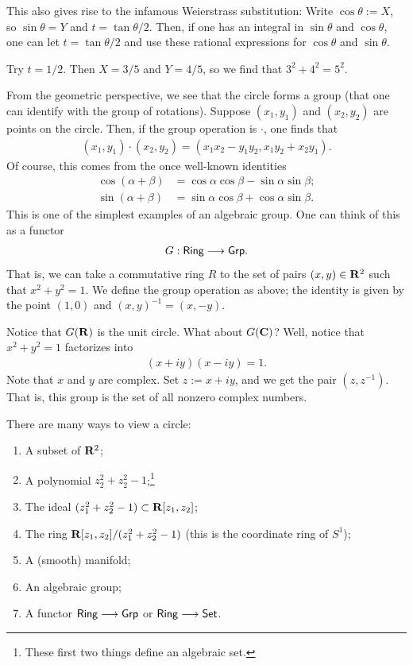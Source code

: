 \documentclass [11 pt, oneside] {article}
\begin{document}
This also gives rise to the infamous Weierstrass substitution: Write $\cos \theta := X$, so $\sin \theta = Y$ and $t= \tan \theta/2$. Then, if one has an integral in $\sin \theta$ and $\cos \theta$, one can let $t = \tan\theta/2$ and use these rational expressions for $\cos\theta$ and $\sin \theta$.

Try $t=1/2$. Then $X=3/5$ and $Y=4/5$, so we find that $3^2 + 4^2 = 5^2$.

From the geometric perspective, we see that the circle forms a group (that one can identify with the group of rotations). Suppose $(x_1,y_1)$ and $(x_2,y_2)$ are points on the circle. Then, if the group operation is $\cdot$, one finds that
\begin{align*}
	(x_1,y_1) \cdot (x_2,y_2) = (x_1x_2-y_1y_2, x_1y_2+x_2y_1).
\end{align*}
Of course, this comes from the once well-known identities
\begin{align*}
	\cos(\alpha+\beta) &=\cos\alpha \cos\beta- \sin \alpha \sin \beta;\\
	\sin(\alpha + \beta) &= \sin\alpha \cos\beta + \cos \alpha \sin \beta.
\end{align*}
This is one of the simplest examples of an algebraic group. One can think of this as a functor
\begin{align*}
	G : \textsf{Ring} \longrightarrow \textsf{Grp}.
\end{align*}
That is, we can take a commutative ring $R$ to the set of pairs $(x,y)\in \mathbf R^2$ such that $x^2+y^2=1$. We define the group operation as above; the identity is given by the point $(1,0)$ and $(x,y) ^{-1} = (x,-y)$.

Notice that $G(\mathbf R)$ is the unit circle. What about $G(\mathbf C)$? Well, notice that $x^2+y^2 =1$ factorizes into
\begin{align*}
	(x+iy) (x-iy) = 1.
\end{align*}
Note that $x$ and $y$ are complex. Set $z := x+iy$, and we get the pair $(z,z^{-1})$. That is, this group is the set of all nonzero complex numbers.

There are many ways to view a circle:
\begin{enumerate}
	\item A subset of $\mathbf R^2$;
	\item A polynomial $z_2^2 + z_2^2 -1$;\footnote{These first two things define an algebraic set.}
	\item The ideal $(z_1^2+z_2^2-1)\subset \mathbf R[z_1,z_2]$;
	\item The ring $\mathbf R[z_1,z_2] / (z_1^2+z_2^2-1)$ (this is the coordinate ring of $S^1$);
	\item A (smooth) manifold;
	\item An algebraic group;
	\item A functor $\textsf{Ring}\longrightarrow \textsf{Grp}$ or $\textsf{Ring} \longrightarrow \textsf{Set}$.
\end{enumerate}
\end{document}
